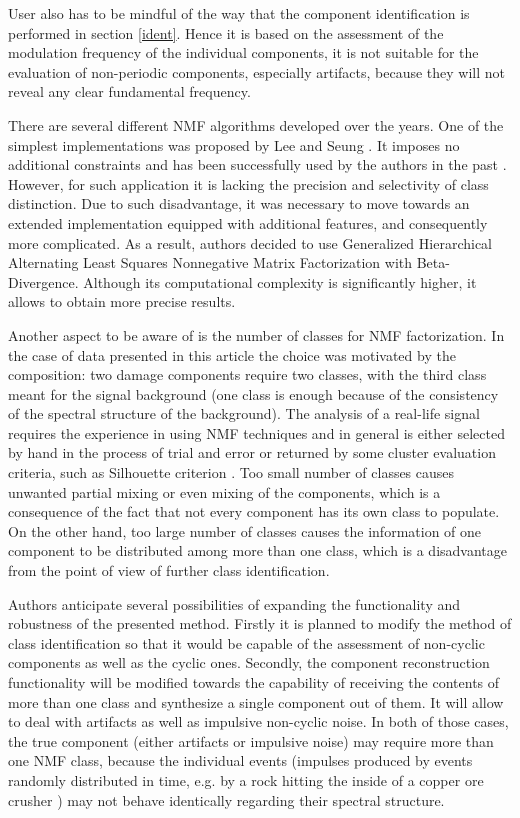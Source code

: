 \documentclass[3p,12pt]{elsarticle}
\begin{document}
User also has to be mindful of the way that the component identification is performed in section \ref{ident}. Hence it is based on the assessment of the modulation frequency of the individual components, it is not suitable for the evaluation of non-periodic components, especially artifacts, because they will not reveal any clear fundamental frequency.

There are several different NMF algorithms developed over the years. One of the simplest implementations was proposed by Lee and Seung \cite{lee1999learning}. It imposes no additional constraints and has been successfully used by the authors in the past \cite{wodecki2019novel}. However, for such application it is lacking the precision and selectivity of class distinction. Due to such disadvantage, it was necessary to move towards an extended implementation equipped with additional features, and consequently more complicated. As a result, authors decided to use Generalized Hierarchical Alternating Least Squares Nonnegative Matrix Factorization with Beta-Divergence. Although its computational complexity is significantly higher, it allows to obtain more precise results. 

Another aspect to be aware of is the number of classes for NMF factorization. In the case of data presented in this article the choice was motivated by the composition: two damage components require two classes, with the third class meant for the signal background (one class is enough because of the consistency of the spectral structure of the background). The analysis of a real-life signal requires the experience in using NMF techniques and in general is either selected by hand in the process of trial and error or returned by some cluster evaluation criteria, such as Silhouette criterion \cite{rousseeuw1987silhouettes}. Too small number of classes causes unwanted partial mixing or even mixing of the components, which is a consequence of the fact that not every component has its own class to populate. On the other hand, too large number of classes causes the information of one component to be distributed among more than one class, which is a disadvantage from the point of view of further class identification. 

Authors anticipate several possibilities of expanding the functionality and robustness of the presented method. Firstly it is planned to modify the method of class identification so that it would be capable of the assessment of non-cyclic components as well as the cyclic ones. Secondly, the component reconstruction functionality will be modified towards the capability of receiving the contents of more than one class and synthesize a single component out of them. It will allow to deal with artifacts as well as impulsive non-cyclic noise. In both of those cases, the true component (either artifacts or impulsive noise) may require more than one NMF class, because the individual events (impulses produced by events randomly distributed in time, e.g. by a rock hitting the inside of a copper ore crusher \cite{wylomanska2016impulsive}) may not behave identically regarding their spectral structure.
\end{document}

